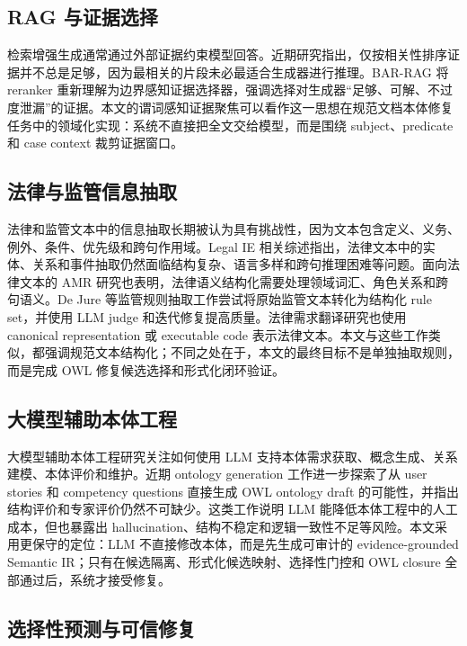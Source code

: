 \documentclass[11pt]{article}
\begin{document}
\subsection{RAG 与证据选择}

检索增强生成通常通过外部证据约束模型回答\cite{lewis2020rag}。近期研究指出，仅按相关性排序证据并不总是足够，因为最相关的片段未必最适合生成器进行推理。BAR-RAG 将 reranker 重新理解为边界感知证据选择器，强调选择对生成器“足够、可解、不过度泄漏”的证据\cite{sun2026barrag}。本文的谓词感知证据聚焦可以看作这一思想在规范文档本体修复任务中的领域化实现：系统不直接把全文交给模型，而是围绕 subject、predicate 和 case context 裁剪证据窗口。

\subsection{法律与监管信息抽取}

法律和监管文本中的信息抽取长期被认为具有挑战性，因为文本包含定义、义务、例外、条件、优先级和跨句作用域。Legal IE 相关综述指出，法律文本中的实体、关系和事件抽取仍然面临结构复杂、语言多样和跨句推理困难等问题\cite{premasiri2025legalie}。面向法律文本的 AMR 研究也表明，法律语义结构化需要处理领域词汇、角色关系和跨句语义\cite{vu2022legalamr}。De Jure 等监管规则抽取工作尝试将原始监管文本转化为结构化 rule set，并使用 LLM judge 和迭代修复提高质量\cite{guliani2026dejure}。法律需求翻译研究也使用 canonical representation 或 executable code 表示法律文本\cite{singhal2025legalrequirements}。本文与这些工作类似，都强调规范文本结构化；不同之处在于，本文的最终目标不是单独抽取规则，而是完成 OWL 修复候选选择和形式化闭环验证。

\subsection{大模型辅助本体工程}

大模型辅助本体工程研究关注如何使用 LLM 支持本体需求获取、概念生成、关系建模、本体评价和维护\cite{llmontology2026survey}。近期 ontology generation 工作进一步探索了从 user stories 和 competency questions 直接生成 OWL ontology draft 的可能性，并指出结构评价和专家评价仍然不可缺少\cite{lippolis2025ontologygeneration}。这类工作说明 LLM 能降低本体工程中的人工成本，但也暴露出 hallucination、结构不稳定和逻辑一致性不足等风险。本文采用更保守的定位：LLM 不直接修改本体，而是先生成可审计的 evidence-grounded Semantic IR；只有在候选隔离、形式化候选映射、选择性门控和 OWL closure 全部通过后，系统才接受修复。

\subsection{选择性预测与可信修复}
\end{document}
